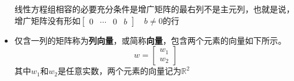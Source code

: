 \documentclass[UTF8]{report}
\begin{document}
\begin{itemize}
\begin{theorem}[存在与唯一性定理]
			线性方程组相容的必要充分条件是增广矩阵的最右列不是主元列，也就是说，增广矩阵没有形如$\begin{bmatrix} 0 & \cdots & 0 & b \end{bmatrix}\quad b \neq 0$的行
		\end{theorem}
		\item 仅含一列的矩阵称为\textbf{列向量}，或简称\textbf{向量}，包含两个元素的向量如下所示。
		\begin{displaymath}
		w=\begin{bmatrix}
		w_1\\
		w_2
		\end{bmatrix}
		\end{displaymath}其中$w_1$和$w_2$是任意实数，两个元素的向量记为$\mathbb{R}^2$
	\end{itemize}
\end{document}
